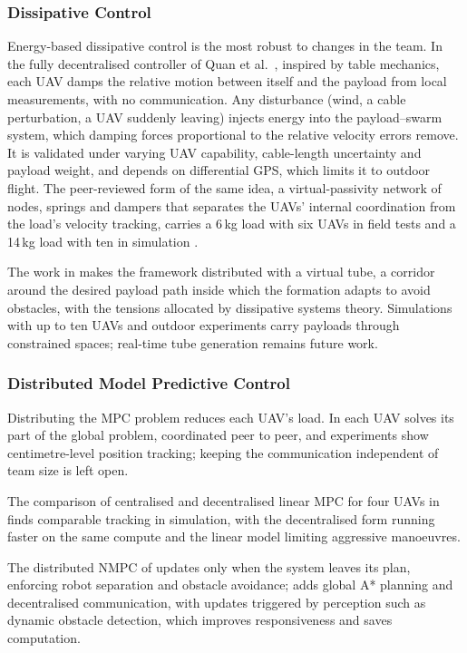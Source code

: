 \subsubsection{Dissipative Control}

Energy-based dissipative control is the most robust to changes in the team. In the fully decentralised controller of Quan et al.\ \cite{quan2025swarm}, inspired by table mechanics, each UAV damps the relative motion between itself and the payload from local measurements, with no communication. Any disturbance (wind, a cable perturbation, a UAV suddenly leaving) injects energy into the payload--swarm system, which damping forces proportional to the relative velocity errors remove. It is validated under varying UAV capability, cable-length uncertainty and payload weight, and depends on differential GPS, which limits it to outdoor flight. The peer-reviewed form of the same idea, a virtual-passivity network of nodes, springs and dampers that separates the UAVs' internal coordination from the load's velocity tracking, carries a 6\,kg load with six UAVs in field tests and a 14\,kg load with ten in simulation \cite{liu2026passivity}.

The work in \cite{liuVirtualTubeBasedCooperativeTransport2026} makes the framework distributed with a virtual tube, a corridor around the desired payload path inside which the formation adapts to avoid obstacles, with the tensions allocated by dissipative systems theory. Simulations with up to ten UAVs and outdoor experiments carry payloads through constrained spaces; real-time tube generation remains future work.

\subsubsection{Distributed Model Predictive Control}

Distributing the MPC problem reduces each UAV's load. In \cite{distributedNMPC} each UAV solves its part of the global problem, coordinated peer to peer, and experiments show centimetre-level position tracking; keeping the communication independent of team size is left open.

The comparison of centralised and decentralised linear MPC for four UAVs in \cite{DistributedMPC} finds comparable tracking in simulation, with the decentralised form running faster on the same compute and the linear model limiting aggressive manoeuvres.

The distributed NMPC of \cite{tasoojiEventTriggeredNonlinearModel} updates only when the system leaves its plan, enforcing robot separation and obstacle avoidance; \cite{tasoojiCooperativeControlMultiQuadrotors} adds global A* planning and decentralised communication, with updates triggered by perception such as dynamic obstacle detection, which improves responsiveness and saves computation.

